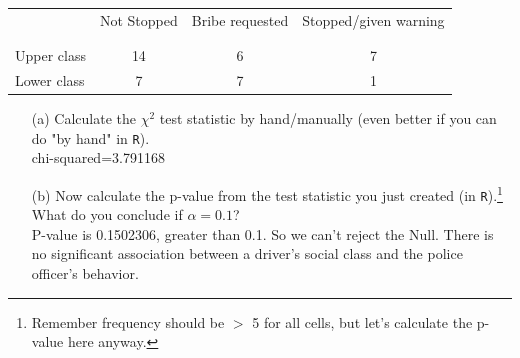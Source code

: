 \documentclass[12pt,letterpaper]{article}
\begin{document}
\newpage
\begin{table}[h!]
	\centering
	\begin{tabular}{l | c c c }
		& Not Stopped & Bribe requested & Stopped/given warning \\
		\\[-1.8ex] 
		\hline \\[-1.8ex]
		Upper class & 14 & 6 & 7 \\
		Lower class & 7 & 7 & 1 \\
		\hline
	\end{tabular}
\end{table}
 	\vspace{1cm}
\begin{enumerate}
	\item [(a)]
	Calculate the $\chi^2$ test statistic by hand/manually (even better if you can do "by hand" in \texttt{R}).\\
	
	chi-squared=3.791168\\
\end{enumerate}
	
 	\vspace{5cm}	
\begin{enumerate}
	\item [(b)]
	Now calculate the p-value from the test statistic you just created (in \texttt{R}).\footnote{Remember frequency should be $>$ 5 for all cells, but let's calculate the p-value here anyway.}  What do you conclude if $\alpha = 0.1$?\\
	
	P-value is 0.1502306, greater than 0.1. So we can't reject the Null. There is no significant association between a driver's social class and the police officer's behavior.\\
\end{enumerate}

 	\vspace{1cm}
\end{document}
